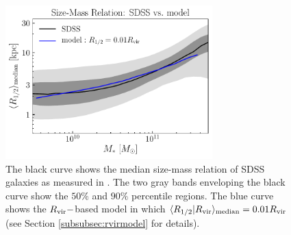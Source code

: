\documentclass[usenatbib,usegraphicx,letterpaper]{mn2e}
\newcommand{\rhalf}{R_{1/2}}
\newcommand{\rvir}{R_{\rm vir}}
\newcommand{\median}[2]{\langle{#1}\vert{#2}\rangle_{\rm median}}
\begin{document}
\begin{figure}
\centering
\includegraphics[width=8cm]{FIGS/rvir_only_rhalf_vs_mstar_sham_model.pdf}
\caption{
The black curve shows the median size-mass relation of SDSS galaxies as measured in \citet{meert_etal15}. The two gray bands enveloping the black curve show the $50\%$ and $90\%$ percentile regions. The blue curve shows the $\rvir-$based model in which $\median{\rhalf}{\rvir}=0.01\rvir$ (see Section \ref{subsubsec:rvirmodel} for details).  
}
\label{fig:scatter_plot}
\end{figure}
\end{document}
